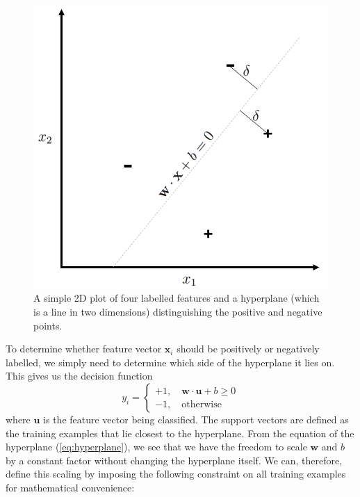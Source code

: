 \documentclass[12pt,a4paper,twoside,openright]{report}
\begin{document}
\begin{figure}
	\begin{center}
		\includegraphics[scale=0.6]{figs/hyperplane.png}
	\end{center}
	\caption{A simple 2D plot of four labelled features and a hyperplane (which is a line in two dimensions) distinguishing the positive and negative points.}
	\label{fig:hyperplane}
\end{figure}
\newline
\newline
To determine whether feature vector $\mathbf{x}_i$ should be positively or negatively labelled, we simply need to determine which side of the hyperplane it lies on. This gives us the decision function
\begin{equation} \label{eq:initialdecision}
	y_i =
	\begin{cases}
		+1, \quad \mathbf{w} \cdot \mathbf{u} + b \ge 0 \\
		-1, \quad \text{otherwise}
	\end{cases}
\end{equation}
where $\mathbf{u}$ is the feature vector being classified. The support vectors are defined as the training examples that lie closest to the hyperplane. From the equation of the hyperplane (\ref{eq:hyperplane}), we see that we have the freedom to scale $\mathbf{w}$ and $b$ by a constant factor without changing the hyperplane itself. We can, therefore, define this scaling by imposing the following constraint on all training examples for mathematical convenience:
\end{document}
